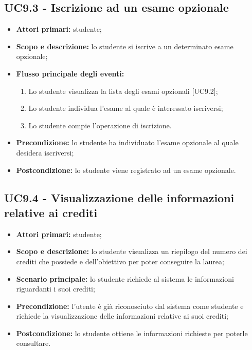 \documentclass[AnalisiDeiRequisiti.tex]{subfiles}
\begin{document}
\subsection{UC9.3 - Iscrizione ad un esame opzionale}
\begin{itemize}
	\item \textbf{Attori primari:} studente;
	\item \textbf{Scopo e descrizione:} lo studente si iscrive a un determinato esame opzionale;
	\item \textbf{Flusso principale degli eventi:}
	\begin{enumerate}
		\item Lo studente visualizza la lista degli esami opzionali [UC9.2];
		\item Lo studente individua l'esame al quale è interessato iscriversi;
		\item Lo studente compie l'operazione di iscrizione.
	\end{enumerate}
	\item \textbf{Precondizione:} lo studente ha individuato l'esame opzionale al quale desidera iscriversi;
	\item \textbf{Postcondizione:} lo studente viene registrato ad un esame opzionale.
\end{itemize}

\subsection{UC9.4 - Visualizzazione delle informazioni relative ai crediti}
\begin{itemize}
	\item \textbf{Attori primari:} studente;
	\item \textbf{Scopo e descrizione:} lo studente visualizza un riepilogo del numero dei crediti che possiede e dell'obiettivo per poter conseguire la laurea;
	\item \textbf{Scenario principale:} lo studente richiede al sistema le informazioni riguardanti i suoi crediti;
	\item \textbf{Precondizione:} l'utente è già riconosciuto dal sistema come studente e richiede la visualizzazione delle informazioni relative ai suoi crediti;
	\item \textbf{Postcondizione:} lo studente ottiene le informazioni richieste per poterle consultare.
\end{itemize}
\end{document}
